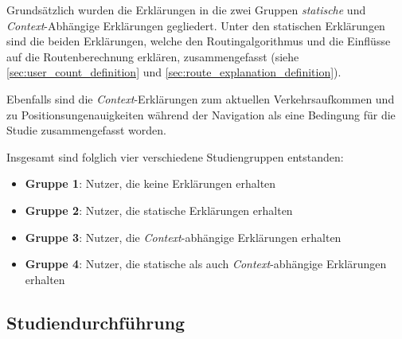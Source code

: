 Grundsätzlich wurden die Erklärungen in die zwei Gruppen \textit{statische} und \textit{Context}-Abhängige Erklärungen gegliedert. Unter den statischen Erklärungen sind die beiden Erklärungen, welche den Routingalgorithmus und die Einflüsse auf die Routenberechnung erklären, zusammengefasst (siehe \autoref{sec:user_count_definition} und \autoref{sec:route_explanation_definition}).

Ebenfalls sind die \textit{Context}-Erklärungen zum aktuellen Verkehrsaufkommen und zu Positionsungenauigkeiten während der Navigation als eine Bedingung für die Studie zusammengefasst worden.

Insgesamt sind folglich vier verschiedene Studiengruppen entstanden:

\begin{itemize}
    \item \textbf{Gruppe 1}: Nutzer, die keine Erklärungen erhalten
    \item \textbf{Gruppe 2}: Nutzer, die statische Erklärungen erhalten
    \item \textbf{Gruppe 3}: Nutzer, die \textit{Context}-abhängige Erklärungen erhalten
    \item \textbf{Gruppe 4}: Nutzer, die statische als auch \textit{Context}-abhängige Erklärungen erhalten
\end{itemize}

\subsection{Studiendurchführung}